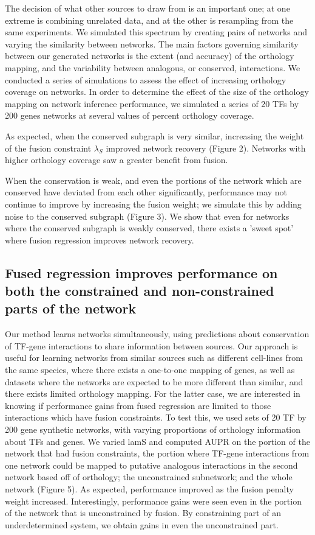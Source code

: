 \documentclass[11pt]{article}
\begin{document}
The decision of what other sources to draw from is an important one; at one extreme is combining unrelated data, and at the other is resampling from the same experiments. We simulated this spectrum by creating pairs of networks and varying the similarity between networks. The main factors governing similarity between our generated networks is the extent (and accuracy) of the orthology mapping, and the variability between analogous, or conserved, interactions. We conducted a series of simulations to assess the effect of increasing orthology coverage on networks. In order to determine the effect of the size of the orthology mapping on network inference performance, we simulated a series of 20 TFs by 200 genes networks at several values of percent orthology coverage. 

As expected, when the conserved subgraph is very similar, increasing the weight of the fusion constraint $\lambda_S$ improved network recovery (Figure 2). Networks with higher orthology coverage saw a greater benefit from fusion.

When the conservation is weak, and even the portions of the network which are conserved have deviated from each other significantly, performance may not continue to improve by increasing the fusion weight; we simulate this by adding noise to the conserved subgraph (Figure 3). We show that even for networks where the conserved subgraph is weakly conserved, there exists a 'sweet spot' where fusion regression improves network recovery. 


\subsection{Fused regression improves performance on both the constrained and non-constrained parts of the network}
Our method learns networks simultaneously, using predictions about conservation of TF-gene interactions to share information between sources. Our approach is useful for learning networks from similar sources such as different cell-lines from the same species, where there exists a one-to-one mapping of genes, as well as datasets where the networks are expected to be more different than similar, and there exists limited orthology mapping. For the latter case, we are interested in knowing if performance gains from fused regression are limited to those interactions which have fusion constraints. To test this, we used sets of 20 TF by 200 gene synthetic networks, with varying proportions of orthology information about TFs and genes. We varied lamS and computed AUPR on the portion of the network that had fusion constraints, the portion where TF-gene interactions from one network could be mapped to putative analogous interactions in the second network based off of orthology; the unconstrained subnetwork; and the whole network (Figure 5). As expected, performance improved as the fusion penalty weight increased. Interestingly, performance gains were seen even in the portion of the network that is unconstrained by fusion. By constraining part of an underdetermined system, we obtain gains in even the unconstrained part. 
\end{document}
